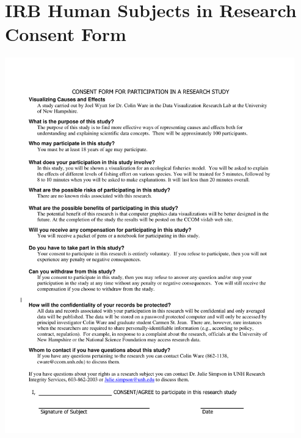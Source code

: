 \chapter{IRB Human Subjects in Research Consent Form} \label{sec:irbConsent}

%
\includegraphics[width=0.94\textwidth]{figures/IRB_Consent_4917.pdf}